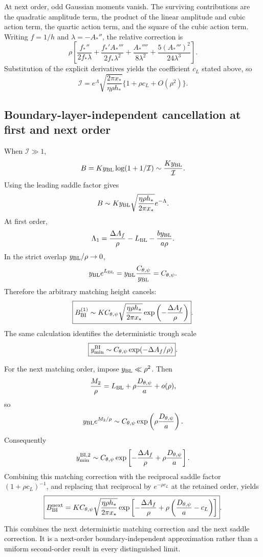 \documentclass[11pt]{article}
\begin{document}
At next order, odd Gaussian moments vanish. The surviving contributions are the quadratic amplitude term, the product of the linear amplitude and cubic action term, the quartic action term, and the square of the cubic action term. Writing \(f=1/h\) and \(\lambda=-A_*''\), the relative correction is
\[
\rho\left[
\frac{f_*''}{2f_*\lambda}
+\frac{f_*'A_*'''}{2f_*\lambda^2}
+\frac{A_*''''}{8\lambda^2}
+\frac{5(A_*''')^2}{24\lambda^3}
\right].
\]
Substitution of the explicit derivatives yields the coefficient \(c_L\) stated above, so
\[
\mathcal I=e^\Lambda\sqrt{\frac{2\pi x_*}{\eta\rho h_*}}
\{1+\rho c_L+O(\rho^2)\}.
\]

\subsection{Boundary-layer-independent cancellation at first and next order}
When \(\mathcal I\gg1\),
\[
B=Ky_{\rm BL}\log(1+1/\mathcal I)
\sim\frac{Ky_{\rm BL}}{\mathcal I}.
\]
Using the leading saddle factor gives
\[
B\sim Ky_{\rm BL}\sqrt{\frac{\eta\rho h_*}{2\pi x_*}}e^{-\Lambda}.
\]
At first order,
\[
\Lambda_1=\frac{\Delta A_f}{\rho}
-L_{\rm BL}-\frac{b y_{\rm BL}}{a\rho}.
\]
In the strict overlap \(y_{\rm BL}/\rho\to0\),
\[
y_{\rm BL}e^{L_{\rm BL}}
=y_{\rm BL}\frac{C_{\theta,\psi}}{y_{\rm BL}}
=C_{\theta,\psi}.
\]
Therefore the arbitrary matching height cancels:
\[
\boxed{
B_{\rm BI}^{(1)}
\sim KC_{\theta,\psi}\sqrt{\frac{\eta\rho h_*}{2\pi x_*}}
\exp\left(-\frac{\Delta A_f}{\rho}\right)
}.
\]
The same calculation identifies the deterministic trough scale
\[
\boxed{y_{\min}^{\rm BI}
\sim C_{\theta,\psi}\exp(-\Delta A_f/\rho)}.
\]

For the next matching order, impose \(y_{\rm BL}\ll\rho^2\). Then
\[
\frac{M_2}{\rho}=L_{\rm BL}+\rho\frac{D_{\theta,\psi}}a+o(\rho),
\]
so
\[
y_{\rm BL}e^{M_2/\rho}
\sim C_{\theta,\psi}\exp\left(\rho\frac{D_{\theta,\psi}}a\right).
\]
Consequently
\[
y_{\min}^{\rm BI,2}
\sim C_{\theta,\psi}
\exp\left[-\frac{\Delta A_f}{\rho}+\rho\frac{D_{\theta,\psi}}a\right].
\]
Combining this matching correction with the reciprocal saddle factor \((1+\rho c_L)^{-1}\), and replacing that reciprocal by \(e^{-\rho c_L}\) at the retained order, yields
\[
\boxed{
B_{\rm BI}^{\rm next}
=KC_{\theta,\psi}\sqrt{\frac{\eta\rho h_*}{2\pi x_*}}
\exp\left[-\frac{\Delta A_f}{\rho}
+\rho\left(\frac{D_{\theta,\psi}}a-c_L\right)\right]
}.
\]
This combines the next deterministic matching correction and the next saddle correction. It is a next-order boundary-independent approximation rather than a uniform second-order result in every distinguished limit.
\end{document}

